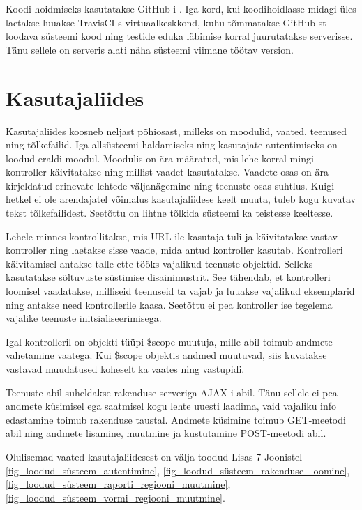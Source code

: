 \documentclass[a4paper,12pt]{article} %
\begin{document}
Koodi hoidmiseks kasutatakse GitHub-i \cite{GitHub}. Iga kord, kui koodihoidlasse midagi üles laetakse luuakse TravisCI-s \cite{TravisCI} virtuaalkeskkond, kuhu tõmmatakse GitHub-st loodava süsteemi kood ning testide eduka läbimise korral juurutatakse serverisse. Tänu sellele on serveris alati näha süsteemi viimane töötav version.

\section{Kasutajaliides}
Kasutajaliides koosneb neljast põhiosast, milleks on moodulid, vaated, teenused ning tõlkefailid. Iga allsüsteemi haldamiseks ning kasutajate autentimiseks on loodud eraldi moodul. Moodulis on ära määratud, mis lehe korral mingi kontroller käivitatakse ning millist vaadet kasutatakse. Vaadete osas on ära kirjeldatud erinevate lehtede väljanägemine ning teenuste osas suhtlus. Kuigi hetkel ei ole arendajatel võimalus kasutajaliidese keelt muuta, tuleb kogu kuvatav tekst tõlkefailidest. Seetõttu on lihtne tõlkida süsteemi ka teistesse keeltesse.\par
Lehele minnes kontrollitakse, mis URL-ile kasutaja tuli ja käivitatakse vastav kontroller ning laetakse sisse vaade, mida antud kontroller kasutab. Kontrolleri käivitamisel antakse talle ette tööks vajalikud teenuste objektid. Selleks kasutatakse sõltuvuste süstimise disainimustrit. See tähendab, et kontrolleri loomisel vaadatakse, milliseid teenuseid ta vajab ja luuakse vajalikud eksemplarid ning antakse need kontrollerile kaasa. Seetõttu ei pea kontroller ise tegelema vajalike teenuste initsialiseerimisega.\par
Igal kontrolleril on objekti tüüpi \$scope muutuja, mille abil toimub andmete vahetamine vaatega. Kui \$scope objektis andmed muutuvad, siis kuvatakse vastavad muudatused koheselt ka vaates ning vastupidi.\par
Teenuste abil suheldakse rakenduse serveriga AJAX-i abil. Tänu sellele ei pea andmete küsimisel ega saatmisel kogu lehte uuesti laadima, vaid vajaliku info edastamine toimub rakenduse taustal. Andmete küsimine toimub GET-meetodi abil ning andmete lisamine, muutmine ja kustutamine POST-meetodi abil.
\par
Olulisemad vaated kasutajaliidesest on välja toodud Lisas 7 Joonistel \ref{fig_loodud_süsteem_autentimine}, \ref{fig_loodud_süsteem_rakenduse_loomine}, \ref{fig_loodud_süsteem_raporti_regiooni_muutmine}, \ref{fig_loodud_süsteem_vormi_regiooni_muutmine}.
\end{document}
